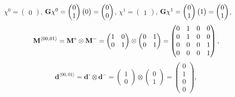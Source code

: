 $\chi^0 = \begin{pmatrix} 0 \end{pmatrix} $, 
$\mathbf{G}\chi^0  =  \begin{pmatrix} 0 \\ 1 \end{pmatrix} \begin{pmatrix} 0 \end{pmatrix}= \begin{pmatrix}  0 \\ 0 \end{pmatrix}$,
$\chi^1 = \begin{pmatrix} 1 \end{pmatrix} $, 
$\mathbf{G} \chi^1 = \begin{pmatrix} 0 \\ 1 \end{pmatrix}  \begin{pmatrix} 1 \end{pmatrix}= \begin{pmatrix}  0 \\ 1 \end{pmatrix}$,
\begin{equation*}
\mathbf{M}^{\langle 00, 01 \rangle} = \mathbf{M}^\circ \otimes \mathbf{M}^- = 
\begin{pmatrix} 1 &0 \\ 0 & 1\end{pmatrix}  \otimes
\begin{pmatrix} 0 & 1 \\ 0 & 1 \end{pmatrix} =
\begin{pmatrix} 0 &1 & 0 & 0 \\ 0 & 1 & 0 & 0 \\
0 & 0 & 0 & 1\\ 0 & 0 & 0 & 1 \end{pmatrix},
\end{equation*}
\begin{equation*}
\mathbf{d}^{\langle 00, 01 \rangle} = \mathbf{d}^\circ \otimes \mathbf{d}^- = \begin{pmatrix} 1 \\ 0 \end{pmatrix} \otimes \begin{pmatrix}  0 \\ 1 \end{pmatrix} = \begin{pmatrix}  0 \\ 1 \\ 0 \\ 0 \end{pmatrix},
\end{equation*}

